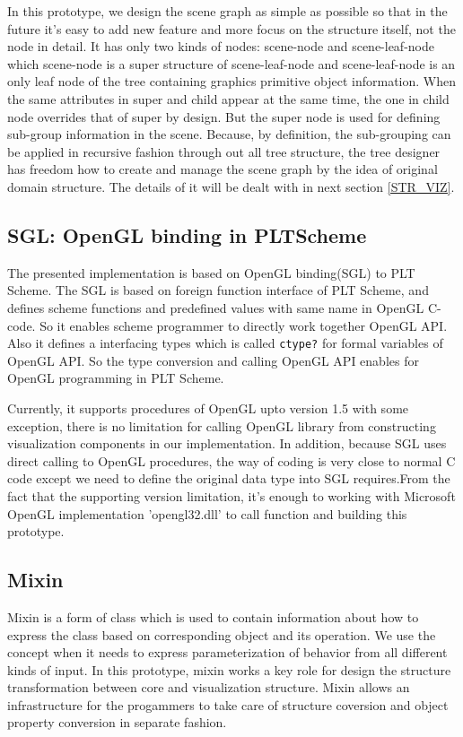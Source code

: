 \documentclass[preprint,nocopyrightspace]{sigplanconf}
\begin{document}
In this prototype, we design the scene graph as simple as possible so that in the future it's easy to add new feature and more focus on the structure itself, not the node in detail. It has only two kinds of nodes: scene-node and scene-leaf-node which scene-node is a super structure of scene-leaf-node and scene-leaf-node is an only leaf node of the tree containing graphics primitive object information. When the same attributes in super and child appear at the same time, the one in child node overrides that of super by design. But the super node is used for defining sub-group information in the scene. Because, by definition, the sub-grouping can be applied in recursive fashion through out all tree structure, the tree designer has freedom how to create and manage the scene graph by the idea of original domain structure. The details of it will be dealt with in next section \ref{STR_VIZ}.

\subsection{SGL: OpenGL binding in PLTScheme}

The presented implementation is based on OpenGL binding(SGL)\cite{SGL} to PLT Scheme. The SGL is based on foreign function interface\cite{Barzilay04foreigninterface} of PLT Scheme, and defines scheme functions and predefined values with same name in OpenGL C-code. So it enables scheme programmer to directly work together OpenGL API. Also it defines a interfacing types which is called \texttt{ctype?} for formal variables of OpenGL API. So the type conversion and calling OpenGL API enables for OpenGL programming in PLT Scheme.

Currently, it supports procedures of OpenGL upto version 1.5 with some exception, there is no limitation for calling OpenGL library from constructing visualization components in our implementation. In addition, because SGL uses direct calling to OpenGL procedures, the way of coding is very close to normal C code except we need to define the original data type into SGL requires.From the fact that the supporting version limitation, it's enough to working with Microsoft OpenGL implementation 'opengl32.dll' to call function and building this prototype.

\subsection{Mixin}

Mixin\cite{Flatt06schemewith} is a form of class which is used to contain information about how to
express the class based on corresponding object and its operation. We use the concept when it needs to express parameterization of behavior from all different kinds of input. In this prototype, mixin works a key role for design the structure transformation between core and visualization structure. Mixin allows an infrastructure for the progammers to take care of structure coversion and object property conversion in separate fashion.
\end{document}
